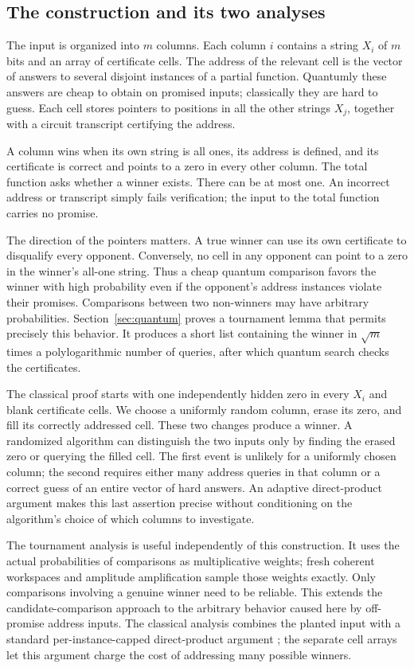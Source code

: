 \documentclass[11pt]{article}
\theoremstyle{definition}
\begin{document}
\subsection{The construction and its two analyses}

The input is organized into $m$ columns. Each column $i$ contains a string
$X_i$ of $m$ bits and an array of certificate cells. The address of the
relevant cell is the vector of answers to several disjoint instances
of a partial function. Quantumly these answers are cheap to obtain on
promised inputs; classically they are hard to guess. Each cell stores
pointers to positions in all the other strings $X_j$, together with a
circuit transcript certifying the address.

A column wins when its own string is all ones, its address is defined,
and its certificate is correct and points to a zero in every other
column. The total function asks whether a winner exists. There can be
at most one. An incorrect address or transcript simply fails verification;
the input to the total function carries no promise.

The direction of the pointers matters. A true winner can use its own
certificate to disqualify every opponent. Conversely, no cell in any
opponent can point to a zero in the winner's all-one string. Thus a cheap
quantum comparison favors the winner with high probability even if the
opponent's address instances violate their promises. Comparisons between
two non-winners may have arbitrary probabilities. Section~\ref{sec:quantum}
proves a tournament lemma that permits precisely this behavior. It
produces a short list containing the winner in $\sqrt m$ times a
polylogarithmic number of queries, after which quantum search checks the
certificates.

The classical proof starts with one independently hidden zero in every
$X_i$ and blank certificate cells. We choose a uniformly random column,
erase its zero, and fill its correctly addressed cell. These two changes
produce a winner. A randomized algorithm can distinguish the two inputs
only by finding the erased zero or querying the filled cell. The first
event is unlikely for a uniformly chosen column; the second requires
either many address queries in that column or a correct guess of an
entire vector of hard answers. An adaptive direct-product argument makes
this last assertion precise without conditioning on the algorithm's
choice of which columns to investigate.

The tournament analysis is useful independently of this construction.
It uses the actual probabilities of comparisons as multiplicative
weights; fresh coherent workspaces and amplitude amplification sample
those weights exactly. Only comparisons involving a genuine winner
need to be reliable. This extends the candidate-comparison approach
to the arbitrary behavior caused here by off-promise address inputs.
The classical analysis combines the planted input with a standard
per-instance-capped direct-product argument
\cite{Shaltiel03,Drucker12}; the separate cell arrays let this argument
charge the cost of addressing many possible winners.
\end{document}

